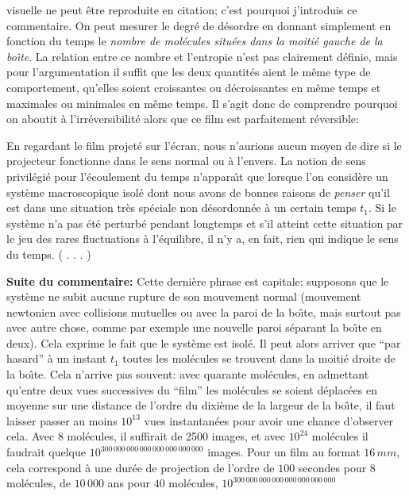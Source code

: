 visuelle ne peut \^etre reproduite en citation; c'est pourquoi 
j'introduis ce commentaire. On peut mesurer le degr\'e de d\'esordre en 
donnant simplement en fonction du temps le {\it nombre de mol\'ecules 
situ\'ees dans la moiti\'e gauche de la bo{\^\i}te}. La relation entre 
ce nombre et l'entropie n'est pas clairement d\'efinie, 
mais pour l'argumentation il suffit que les deux quantit\'es aient le 
m\^eme type de comportement, qu'elles soient croissantes ou 
d\'ecroissantes en m\^eme temps et maximales ou minimales en 
m\^eme temps. Il s'agit donc de comprendre pourquoi on aboutit \`a 
l'irr\'eversibilit\'e alors que ce film est parfaitement r\'eversible: 
\medskip
{\cit  En regardant le film projet\'e sur l'\'ecran, nous n'aurions aucun
moyen de dire si le projecteur fonctionne dans le sens normal ou \`a 
l'envers. La notion de sens privil\'egi\'e pour l'\'ecoulement du temps 
n'appara{\^\i}t que lorsque l'on consid\`ere un syst\`eme macroscopique 
isol\'e dont nous avons de bonnes raisons de {\it penser} qu'il est dans 
une situation tr\`es sp\'eciale non d\'esordonn\'ee \`a un certain temps 
$t_1$. Si le syst\`eme n'a pas \'et\'e perturb\'e pendant longtemps et s'il 
atteint cette situation par le jeu des rares fluctuations \`a l'\'equilibre, 
il n'y a, en fait, rien qui indique le sens du temps. ( . . . ) \par }
\medskip
{\bf Suite du commentaire:} Cette derni\`ere phrase est capitale: 
supposons que le syst\`eme ne subit aucune rupture de son mouvement 
normal (mouvement newtonien avec collisions mutuelles ou avec la paroi 
de la bo{\^\i}te, mais surtout pas avec autre chose, comme par exemple 
une nouvelle paroi s\'eparant la bo{\^\i}te en deux). Cela exprime le 
fait que le syst\`eme est isol\'e. Il peut alors arriver que ``par hasard'' 
\`a un instant $t_1$ toutes les mol\'ecules se trouvent dans la moiti\'e 
droite de la bo{\^\i}te. Cela n'arrive pas souvent: avec quarante 
mol\'ecules, en admettant qu'entre deux vues successives du ``film'' les 
mol\'ecules se soient d\'eplac\'ees en moyenne sur une distance de l'ordre 
du dixi\`eme de la largeur de la bo{\^\i}te, il faut laisser passer au 
moins $10^{13}$ vues instantan\'ees pour avoir une chance d'observer cela. 
Avec $8$ mol\'ecules, il suffirait de 2500 images, et avec $10^{24}$ 
mol\'ecules il faudrait quelque 
$10^{300\, 000\, 000\, 000\, 000\, 000\, 000\, 000}$ images. Pour un 
film au format $16\, mm$, cela correspond \`a une dur\'ee de projection 
de l'ordre de $100$ secondes pour $8$ mol\'ecules, de $10\, 000$ ans 
pour $40$ mol\'ecules, $10^{300\, 000\, 000\, 000\, 000\, 000\, 000\, 000}$ 
